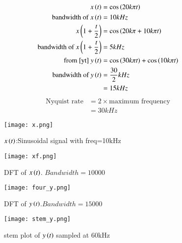 \documentclass[journal,12pt,twocolumn]{IEEEtran}
\begin{document}
\begin{align}
  x\left(t\right)&=\cos{\ensuremath{\left(20k\pi t\right)}}\\
    \text{bandwidth of } x\left(t\right) &= 10 kHz\\
    x\left(1+\frac{t}{2}\right) &= \cos{\ensuremath{\left(20k\pi+10k\pi t\right)}}\\
    \text{bandwidth of } x\left(1+\frac{t}{2}\right) &=  5 kHz\\
    \text{from \eqref{yt} } 
    y\left(t\right)&= \cos{\ensuremath{\left(30k\pi t\right)}}+\cos{\ensuremath{\left(10k\pi t\right)}}\\
    \text{bandwidth of } y\left(t\right) &= \frac{30}{2} kHz\\
    &= 15 kHz
\end{align}
\begin{align}
    \text{Nyquist rate} &= 2 \times \text{maximum frequency}\\
    &= 30 kHz
\end{align}
\begin{figure}[!h]
 \centering
 \texttt{[image: x.png]}
 \caption{$x\left(t\right)$:Sinusoidal signal with freq=10kHz}
\end{figure}
\begin{figure}[!h]
 \centering
 \texttt{[image: xf.png]}
 \caption{DFT of $x\left(t\right)$. $Bandwidth=10000$}
\end{figure}
\begin{figure}[!h]
 \centering
 \texttt{[image: four\_y.png]}
 \caption{DFT of $y\left(t\right)$.$Bandwidth=15000$}
\end{figure}
\begin{figure}[!h]
 \centering
 \texttt{[image: stem\_y.png]}
 \caption{stem plot of $y\left(t\right)$ sampled at 60kHz}
\end{figure}
\end{document}
